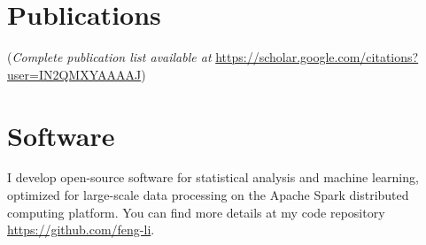 \documentclass[twoside,a4paper]{article}
\begin{document}
\newpage
\section{Publications}

(\emph{Complete publication list available at}
  \url{https://scholar.google.com/citations?user=IN2QMXYAAAAJ})

\begin{refsection}
\nocite{ZhongY2025OptimalStarting}
\nocite{WangWen2025VARX}
\nocite{GaoY2024GridPoint}
\nocite{WangH2024CatastropheDuration}
\nocite{HuangY2024LocalInformation}
\nocite{RenY2023InfiniteForecast}
\nocite{ZhangG2023ProbabilisticForecast}
\nocite{LiF2024ForecasterReview}
\nocite{LiL2023ForecastingLarge}
\nocite{ZhangB2023OptimalReconciliation}
\nocite{LiL2023FeaturebasedIntermittent}
\nocite{WangX2023ForecastCombinations}
\nocite{PanR2022NoteDistributed}
\nocite{LiL2023BayesianForecast}
\nocite{WangZ2022EscalatorAccident}
\nocite{WangX2023DistributedARIMA}
\nocite{AndererM2022HierarchicalForecasting}
\nocite{JanewayMG2021ClinicalDiagnostic}
\nocite{PetropoulosF2022ForecastingTheory}
\nocite{KangY2022ForecastForecasts}
\nocite{TalagalaTS2022FFORMPPFeaturebased}
\nocite{ZhuX2021LeastSquareApproximation}
\nocite{WangX2022UncertaintyEstimation}
\nocite{KangY2021DejaVu}
\nocite{HaoC2020BilinearReduced}
\nocite{LiX2020ForecastingTime}
\nocite{KangY2020GRATISGeneRAting}
\nocite{kang2020statcompcn}
\nocite{kang2020fppcn}
\nocite{KalesanB2020IntersectionsFirearm}
\nocite{BaileyHM2019ChangesPatterns}
\nocite{LiF2019CreditRisk}
\nocite{LiF2018ImprovingForecasting}
\nocite{PinoEC2018CohortProfile}
\nocite{li2016distributedcn}
\nocite{LiF2013BayesianModeling}
\nocite{LiF2013EfficientBayesian}
\nocite{LiF2011ModellingConditional}
\nocite{LiF2010FlexibleModeling}

\printbibliography[heading=none]
\end{refsection}

\section{Software}
I develop open-source software for statistical analysis and machine learning, optimized for large-scale data processing
on the Apache Spark distributed computing platform. You can find more details at my code repository
\url{https://github.com/feng-li}.
\end{document}
